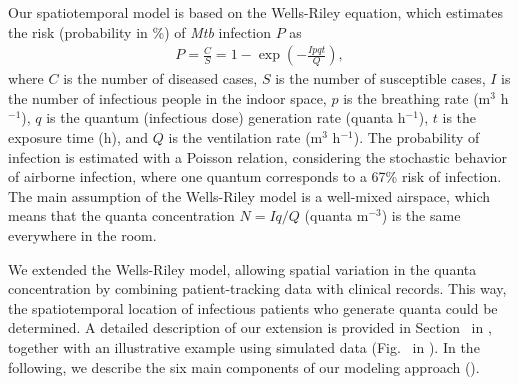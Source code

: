 \documentclass[fleqn,11pt]{wlscirep}
\begin{document}
Our spatiotemporal model is based on the Wells-Riley equation\cite{Riley1961Book}, which estimates the risk (probability in \%) of \emph{Mtb} infection $P$ as
\begin{align}
    P = \frac{C}{S} = 1 - \exp\left(-\frac{Ipqt}{Q}\right),
\end{align}
where $C$ is the number of diseased cases, $S$ is the number of susceptible cases, $I$ is the number of infectious people in the indoor space, $p$ is the breathing rate  (m$^3$ h$^{-1}$), $q$ is the quantum (infectious dose) generation rate (quanta h$^{-1}$), $t$ is the exposure time (h), and $Q$ is the ventilation rate (m$^3$ h$^{-1}$). The probability of infection is estimated with a Poisson relation, considering the stochastic behavior of airborne infection, where one quantum corresponds to a 67\% risk of infection. The main assumption of the Wells-Riley model is a well-mixed airspace, which means that the quanta concentration $N = Iq/Q$ (quanta m$^{-3}$) is the same everywhere in the room. 

We extended the Wells-Riley model, allowing spatial variation in the quanta concentration by combining patient-tracking data with clinical records. This way, the spatiotemporal location of infectious patients who generate quanta could be determined. A detailed description of our extension is provided in Section~ in \supp, together with an illustrative example using simulated data (Fig.~ in \supp). In the following, we describe the six main components of our modeling approach ().
\end{document}

